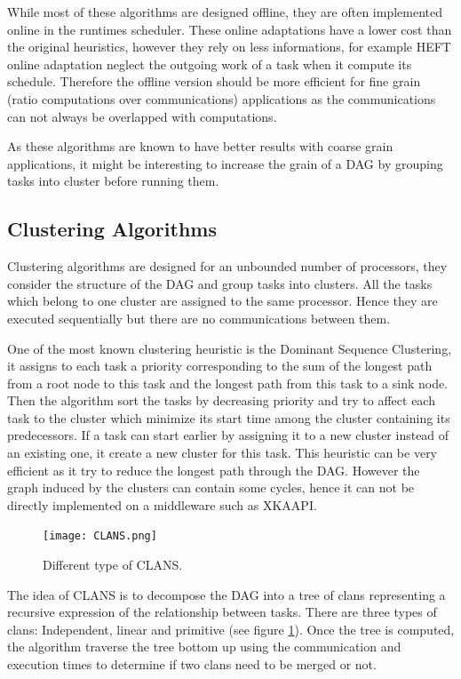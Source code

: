 \documentclass[10pt, conference, compsocconf,pdftex,dvipsnames]{IEEEtran}
\begin{document}
While most of these algorithms are designed offline, they are often
implemented online in the runtimes scheduler. These online adaptations have a
lower cost than the original heuristics, however they rely on less
informations, for example HEFT online adaptation neglect the outgoing work of
a task when it compute its schedule. Therefore the offline version should be
more efficient for fine grain (ratio computations over communications)
applications as the communications can not always be overlapped with
computations.

As these algorithms are known to have better results with coarse grain
applications, it might be interesting to increase the grain of a DAG by
grouping tasks into cluster before running them.

\subsection{Clustering Algorithms}

Clustering algorithms are designed for an unbounded number of processors, they
consider the structure of the DAG and group tasks into clusters. All the tasks
which belong to one cluster are assigned to the same processor. Hence they are
executed sequentially but there are no communications between them.  

One of the most known clustering heuristic is the Dominant Sequence
Clustering\cite{yang1994dsc}, it assigns to each task a priority corresponding
to the sum of the longest path from a root node to this task and the longest
path from this task to a sink node. Then the algorithm sort the tasks by
decreasing priority and try to affect each task to the cluster which minimize
its start time among the cluster containing its predecessors. If a task can
start earlier by assigning it to a new cluster instead of an existing one, it
create a new cluster for this task. This heuristic can be very efficient as it
try to reduce the longest path through the DAG. However the graph induced by
the clusters can contain some cycles, hence it can not be directly implemented
on a middleware such as XKAAPI.

\begin{figure}[htb]
    \centering
    \texttt{[image: CLANS.png]}
    \caption{Different type of CLANS.}
    \label{fig:clans}
\end{figure}

The idea of CLANS
\cite{aubum1990efficient,mccreary1993partitioning,mccreary1993graph} is to
decompose the DAG into a tree of clans representing a recursive expression of
the relationship between tasks. 
There are three types of clans:
Independent, linear and primitive (see figure \ref{fig:clans}). Once the tree
is computed, the algorithm traverse the tree bottom up using the communication
and execution times to determine if two clans need to be merged or not.
\end{document}
